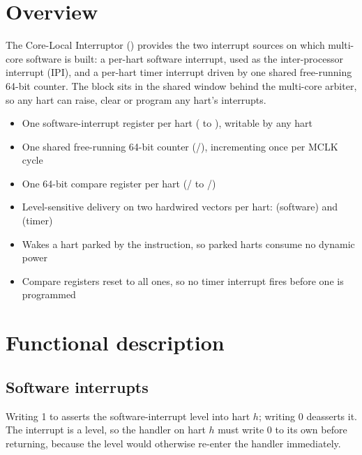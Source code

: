 \section{Overview}

The Core-Local Interruptor () provides the two interrupt sources on which multi-core software is built: a per-hart software interrupt, used as the inter-processor interrupt (IPI), and a per-hart timer interrupt driven by one shared free-running 64-bit counter. The block sits in the shared window behind the multi-core arbiter, so any hart can raise, clear or program any hart's interrupts.

\begin{itemize}
	\item One software-interrupt register per hart ( to ), writable by any hart
	\item One shared free-running 64-bit counter (/), incrementing once per MCLK cycle
	\item One 64-bit compare register per hart (/ to /)
	\item Level-sensitive delivery on two hardwired vectors per hart: \ClintMsipVector{} (software) and \ClintMtipVector{} (timer)
	\item Wakes a hart parked by the  instruction, so parked harts consume no dynamic power
	\item Compare registers reset to all ones, so no timer interrupt fires before one is programmed
\end{itemize}

\section{Functional description}

\subsection{Software interrupts}

Writing 1 to  asserts the software-interrupt level into hart $h$; writing 0 deasserts it. The interrupt is a level, so the handler on hart $h$ must write 0 to its own  before returning, because the level would otherwise re-enter the handler immediately.

